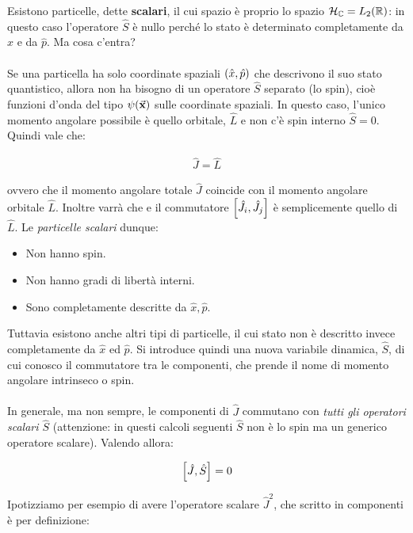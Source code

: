 	Esistono particelle, dette \textbf{scalari}, il cui spazio è proprio lo spazio $\mathcal{H}_{\mathbb{C}} = L_2\qty(\mathbb{R})$: in questo caso l'operatore $\hat{S}$ è nullo perché lo stato è determinato completamente da $\hat{x}$ e da $\hat{p}$. Ma cosa c'entra?
	\\
	\\
	Se una particella ha solo coordinate spaziali $\qty(\hat{x}, \hat{p})$ che descrivono il suo stato quantistico, allora non ha bisogno di un operatore $\hat{S}$ separato (lo spin), cioè funzioni d'onda del tipo $\psi\qty(\va{x})$ sulle coordinate spaziali. In questo caso, l'unico momento angolare possibile è quello orbitale, $\hat{L}$ e non c'è spin interno $\hat{S} = 0$. Quindi vale che:
	
\begin{align*}
	\hat{J} = \hat{L}
\end{align*}
	
	ovvero che il momento angolare totale $\hat{J}$ coincide con il momento angolare orbitale $\hat{L}$. Inoltre varrà che e il commutatore $\qty[\hat{J}_i, \hat{J}_j] $ è semplicemente quello di $\hat{L}$. Le \textit{particelle scalari} dunque:

\begin{itemize}
	\item Non hanno spin.
	\item Non hanno gradi di libertà interni.
	\item Sono completamente descritte da $\hat{x}, \hat{p}$.
\end{itemize} 

	Tuttavia esistono anche altri tipi di particelle, il cui stato non è descritto invece completamente da $\hat{x}$ ed $\hat{p}$. Si introduce quindi una nuova variabile dinamica, $\hat{S}$, di cui conosco il commutatore tra le componenti, che prende il nome di momento angolare intrinseco o spin.
	\\
	\\
	In generale, ma non sempre, le componenti di $\hat{J}$ commutano con \textit{tutti gli operatori scalari $\hat{S}$} (attenzione: in questi calcoli seguenti $\hat{S}$ non è lo spin ma un generico operatore scalare). Valendo allora:

\begin{align*}
	\qty[\hat{J}, \hat{S}] = 0
\end{align*}

	Ipotizziamo per esempio di avere l'operatore scalare $\hat{J}^2$, che scritto in componenti è per definizione:

